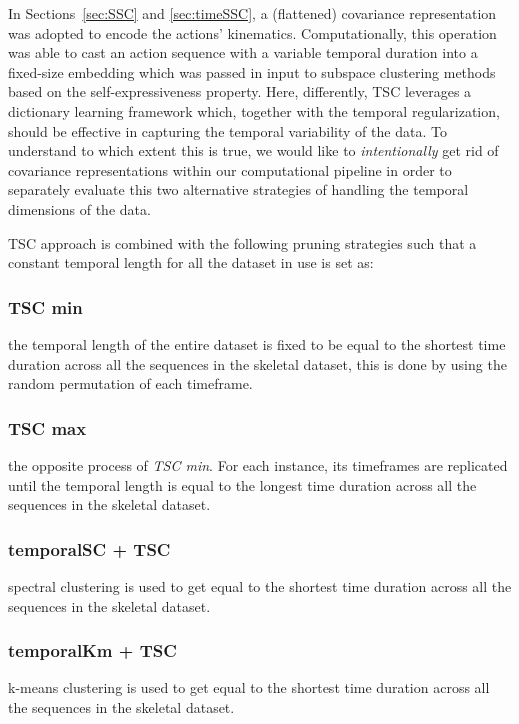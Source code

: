 \documentclass[10pt,a4paper,conference]{IEEEtran}
\begin{document}
In Sections~\ref{sec:SSC} and \ref{sec:timeSSC}, a (flattened) covariance representation was adopted to encode the actions' kinematics. Computationally, this operation was able to cast an action sequence with a variable temporal duration into a fixed-size embedding which was passed in input to subspace clustering methods based on the self-expressiveness property. Here, differently, TSC leverages a dictionary learning framework which, together with the temporal regularization, should be effective in capturing the temporal variability of the data. To understand to which extent this is true, we would like to \emph{intentionally} get rid of covariance representations within our computational pipeline in order to separately evaluate this two alternative strategies of handling the temporal dimensions of the data.


TSC approach is combined with the following pruning strategies such that a constant temporal length  for all the dataset in use is set as:
\subsubsection{TSC min} the temporal length  of the entire dataset is fixed to be equal to the shortest time duration across all the sequences in the skeletal dataset, this is done by using the random permutation of each timeframe.
\subsubsection{TSC max} the opposite process of \emph{TSC min}. For each instance, its timeframes are replicated until the temporal length  is equal to the longest time duration across all the sequences in the skeletal dataset.
\subsubsection{temporalSC + TSC} spectral clustering is used to get  equal to the shortest time duration across all the sequences in the skeletal dataset.
\subsubsection{temporalKm + TSC} k-means clustering is used to get  equal to the shortest time duration across all the sequences in the skeletal dataset.
\end{document}
